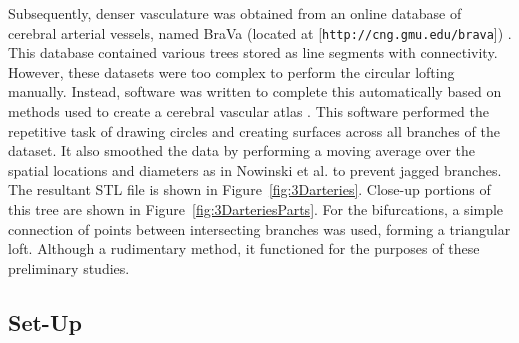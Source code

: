 \documentclass[11pt,english,a4paper,twoside,openright]{report}
\begin{document}
{{{{{{{{Subsequently, denser vasculature was obtained from an online database of cerebral arterial vessels, named BraVa (located at [\texttt{http://cng.gmu.edu/brava}]) \cite{wright2013digital}. This database contained various trees stored as line segments with connectivity. However, these datasets were too complex to perform the circular lofting manually. Instead, software was written to complete this automatically based on methods used to create a cerebral vascular atlas \cite{nowinski2009new}. This software performed the repetitive task of drawing circles and creating surfaces across all branches of the dataset. It also smoothed the data by performing a moving average over the spatial locations and diameters as in Nowinski et al. \cite{nowinski2005informatics} to prevent jagged branches. The resultant STL file is shown in Figure~\ref{fig:3Darteries}. Close-up portions of this tree are shown in Figure~\ref{fig:3DarteriesParts}. For the bifurcations, a simple connection of points between intersecting branches was used, forming a triangular loft. Although a rudimentary method, it functioned for the purposes of these preliminary studies.

\subsection{Set-Up}

}}}}}}}}
\end{document}
